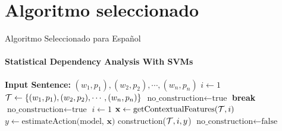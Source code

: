 \documentclass[utf8]{beamer}
\begin{document}
  
  \section{Algoritmo seleccionado}
  \begin{frame}[label=alg]{Algoritmo Seleccionado para Español}
    \framesubtitle{Statistical Dependency Analysis With SVMs}
      \scriptsize
  \begin{algorithmic}[1] %
    \State \textbf{Input Sentence:} $(w_1, p_1),(w_2,p_2),\cdots,(w_n,p_n)$
    \Init
       \State $i\gets 1$
       \State ${\cal T}\gets \{(w_1, p_1),(w_2,p_2),\cdots,(w_n,p_n)\}$
       \State $\text{no\_construction}\gets \text{true}$
    \EndInit
                \textbf{break}
             \EndIf
             \State $\text{no\_construction}\gets \text{true}$
             \State $i\gets 1$
          \Else
             \State $\mathbf{x}\gets \text{getContextualFeatures(${\cal T}, i$)} $
             \State $y\gets \text{estimateAction(model, $\mathbf{x}$)}$
             \State construction(${\cal T}, i, y$)
                $\text{no\_construction}\gets \text{false}$
             \EndIf
          \EndIf
       \EndWhile
    \end{algorithmic}
  \end{frame}
\end{document}
